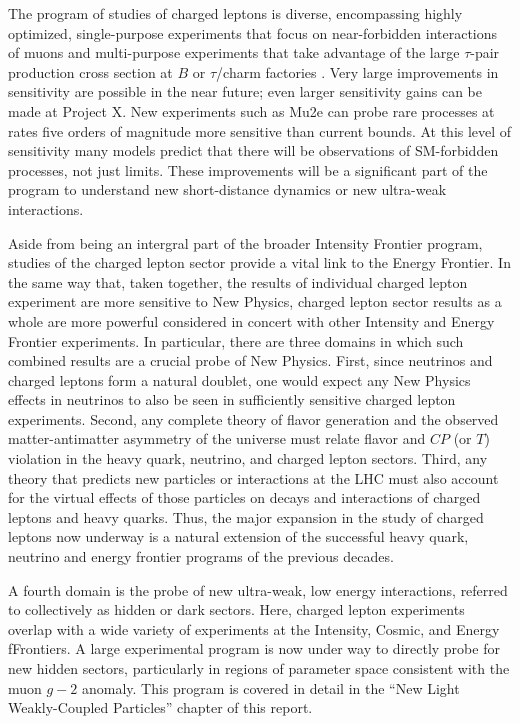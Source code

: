 The program of studies of charged leptons is diverse, encompassing highly optimized, single-purpose experiments that focus on near-forbidden interactions of muons and multi-purpose experiments that take advantage of the large $\tau$-pair production cross section at $B$ or $\tau$/charm factories .
Very large
improvements in sensitivity are possible in the near future; even larger sensitivity gains can be made at Project X.  New
experiments such as Mu2e can probe rare processes at rates five orders
of magnitude more sensitive than current bounds. At this level of sensitivity many models predict that there will be observations of SM-forbidden processes, not just limits. These 
improvements will be a significant part of the program to understand new short-distance dynamics or new ultra-weak interactions.

Aside from being an intergral part of the broader Intensity Frontier program, studies of the  charged lepton sector provide  a vital link to the Energy Frontier. In the same way that, taken together, the results of individual charged
lepton experiment are more sensitive to New Physics, charged lepton sector results as a whole are more
powerful considered in concert with other Intensity and Energy Frontier experiments.  In
particular, there are three domains in which such combined results are a
crucial probe of New Physics.   First, since neutrinos and charged leptons form a 
natural doublet, one would expect any New Physics effects
 in neutrinos to also be seen in sufficiently sensitive charged lepton experiments.  
 Second, any complete theory of 
 flavor generation and the observed matter-antimatter asymmetry of the universe must 
 relate flavor and $C\!P$ (or $T$) violation in the heavy quark, neutrino, and charged lepton sectors.  
 Third,  any theory that predicts new particles or interactions at the LHC must also account for the virtual effects of those particles on decays and interactions of charged leptons and heavy quarks.
Thus, the major expansion in the study of charged leptons now underway is a natural extension of the successful heavy quark, neutrino and energy frontier programs of the previous decades.

A fourth domain is the probe of new ultra-weak, low energy interactions, referred to collectively  as hidden or dark sectors.  Here, charged lepton experiments overlap  with a wide variety of
experiments at the Intensity, Cosmic, and Energy fFrontiers.  A large
experimental program is now under way to directly probe for new
hidden sectors, particularly in regions of parameter space
consistent with the muon $g-2$ anomaly.  This program is covered
in detail in the ``New Light Weakly-Coupled Particles'' chapter of this report.

